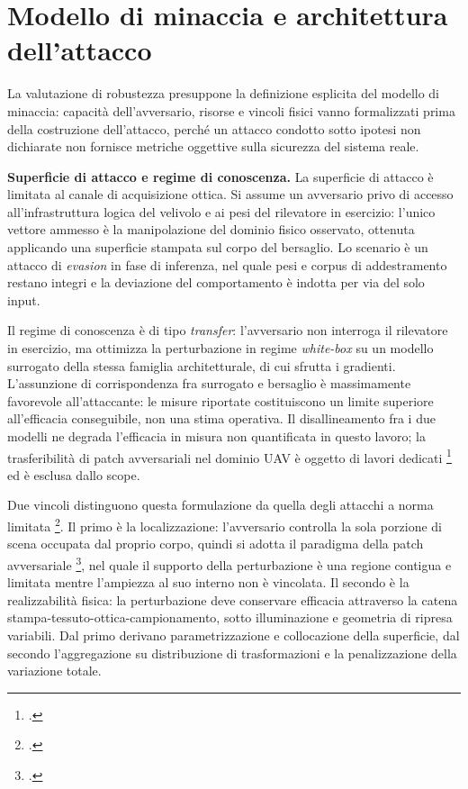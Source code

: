 \documentclass[a4paper,12pt]{report}
\begin{document}
\section{Modello di minaccia e architettura dell'attacco}
\label{sec:attacco}

La valutazione di robustezza presuppone la definizione esplicita del modello di
minaccia: capacità dell'avversario, risorse e vincoli fisici vanno formalizzati
prima della costruzione dell'attacco, perché un attacco condotto sotto ipotesi
non dichiarate non fornisce metriche oggettive sulla sicurezza del sistema
reale.

\textbf{Superficie di attacco e regime di conoscenza.}
\label{sec:threat_model}
La superficie di attacco è limitata al canale di acquisizione ottica. Si assume
un avversario privo di accesso all'infrastruttura logica del velivolo e ai pesi
del rilevatore in esercizio: l'unico vettore ammesso è la manipolazione del
dominio fisico osservato, ottenuta applicando una superficie stampata sul corpo
del bersaglio. Lo scenario è un attacco di \textit{evasion} in fase di
inferenza, nel quale pesi e corpus di addestramento restano integri e la
deviazione del comportamento è indotta per via del solo input.

Il regime di conoscenza è di tipo \textit{transfer}: l'avversario non interroga
il rilevatore in esercizio, ma ottimizza la perturbazione in regime
\textit{white-box} su un modello surrogato della stessa famiglia
architetturale, di cui sfrutta i gradienti. L'assunzione di corrispondenza fra
surrogato e bersaglio è massimamente favorevole all'attaccante: le misure
riportate costituiscono un limite superiore all'efficacia conseguibile, non una
stima operativa. Il disallineamento fra i due modelli ne degrada l'efficacia in
misura non quantificata in questo lavoro; la trasferibilità di patch
avversariali nel dominio UAV è oggetto di lavori dedicati
\footcite{shrestha_2023} ed è esclusa dallo scope.

Due vincoli distinguono questa formulazione da quella degli attacchi a norma
limitata \footcite{carlini_2017}. Il primo è la localizzazione: l'avversario
controlla la sola porzione di scena occupata dal proprio corpo, quindi si adotta
il paradigma della patch avversariale \footcite{brown_2017_patch}, nel quale il
supporto della perturbazione è una regione contigua e limitata mentre l'ampiezza
al suo interno non è vincolata. Il secondo è la realizzabilità fisica: la
perturbazione deve conservare efficacia attraverso la catena
stampa-tessuto-ottica-campionamento, sotto illuminazione e geometria di ripresa
variabili. Dal primo derivano parametrizzazione e collocazione della superficie,
dal secondo l'aggregazione su distribuzione di trasformazioni e la
penalizzazione della variazione totale.
\end{document}
